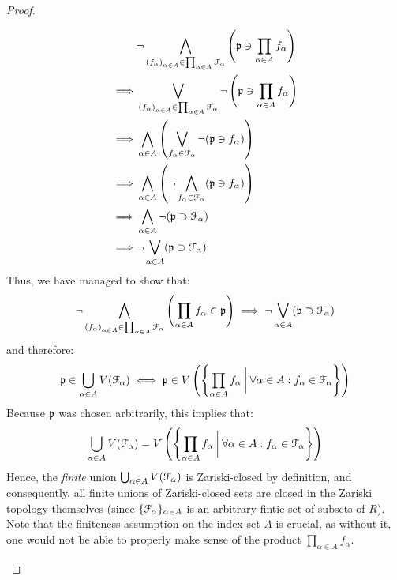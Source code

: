 \begin{proof}
\begin{enumerate}
$$                                        \begin{aligned}
                                            & \neg \bigwedge_{\left(f_{\alpha}\right)_{\alpha \in A} \in \prod_{\alpha \in A} \mathcal{F}_{\alpha}} \left(\mathfrak{p} \ni \prod_{\alpha \in A} f_{\alpha}\right)
                                            \\
                                            \implies & \bigvee_{\left(f_{\alpha}\right)_{\alpha \in A} \in \prod_{\alpha \in A} \mathcal{F}_{\alpha}} \neg \left(\mathfrak{p} \ni \prod_{\alpha \in A} f_{\alpha}\right)
                                            \\
                                            \implies & \bigwedge_{\alpha \in A} \left(\bigvee_{f_{\alpha} \in \mathcal{F}_{\alpha}} \neg(\mathfrak{p} \ni f_{\alpha})\right)
                                            \\
                                            \implies & \bigwedge_{\alpha \in A} \left(\neg \bigwedge_{f_{\alpha} \in \mathcal{F}_{\alpha}} (\mathfrak{p} \ni f_{\alpha})\right)
                                            \\
                                            \implies & \bigwedge_{\alpha \in A} \neg (\mathfrak{p} \supset \mathcal{F}_{\alpha})
                                            \\
                                            \implies & \neg \bigvee_{\alpha \in A} (\mathfrak{p} \supset \mathcal{F}_{\alpha})
                                        \end{aligned}
                                    $$
                                Thus, we have managed to show that:
                                    $$\neg \bigwedge_{\left(f_{\alpha}\right)_{\alpha \in A} \in \prod_{\alpha \in A} \mathcal{F}_{\alpha}} \left(\prod_{\alpha \in A} f_{\alpha} \in \mathfrak{p}\right) \implies  \neg \bigvee_{\alpha \in A} (\mathfrak{p} \supset \mathcal{F}_{\alpha})$$
                                and therefore:
                                    $$\mathfrak{p} \in \bigcup_{\alpha \in A} V(\mathcal{F}_{\alpha}) \iff \mathfrak{p} \in V\left(\left\{\prod_{\alpha \in A} f_{\alpha} \: \bigg| \: \forall \alpha \in A: f_{\alpha} \in \mathcal{F}_{\alpha} \right\}\right)$$
                                Because $\mathfrak{p}$ was chosen arbitrarily, this implies that:
                                    $$\bigcup_{\alpha \in A} V(\mathcal{F}_{\alpha}) = V\left(\left\{\prod_{\alpha \in A} f_{\alpha} \: \bigg| \: \forall \alpha \in A: f_{\alpha} \in \mathcal{F}_{\alpha} \right\}\right)$$
                                Hence, the \textit{finite} union $\bigcup_{\alpha \in A} V(\mathcal{F}_{\alpha})$ is Zariski-closed by definition, and consequently, all finite unions of Zariski-closed sets are closed in the Zariski topology themselves (since $\{\mathcal{F}_{\alpha}\}_{\alpha \in A}$ is an arbitrary fintie set of subsets of $R$). Note that the finiteness assumption on the index set $A$ is crucial, as without it, one would not be able to properly make sense of the product $\prod_{\alpha \in A} f_{\alpha}$.

\end{enumerate}
\end{proof}
